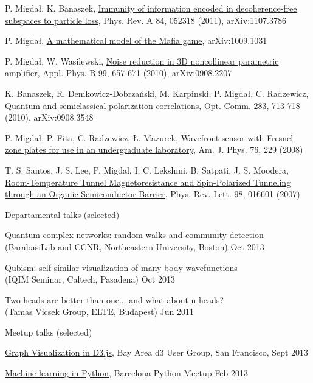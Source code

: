 \documentclass[margin,line]{resume}
\begin{document}
\begin{resume}
\begin{list2}
        \item P. Migdał, K. Banaszek, \href{http://arxiv.org/abs/1107.3786}{Immunity of information encoded in decoherence-free subspaces to particle loss}, Phys. Rev. A 84, 052318 (2011), arXiv:1107.3786
    	\item P. Migdał, \href{http://arxiv.org/abs/1009.1031}{A mathematical model of the Mafia game}, arXiv:1009.1031
        \item P. Migdał, W. Wasilewski, \href{http://dx.doi.org/10.1007/s00340-010-3915-z}{Noise reduction in 3D noncollinear parametric amplifier}, Appl. Phys. B 99, 657-671 (2010), arXiv:0908.2207
        \item K. Banaszek, R. Demkowicz-Dobrzański, M. Karpinski, P. Migdał, C. Radzewicz, \href{http://arxiv.org/abs/0908.3548}{Quantum and semiclassical polarization correlations}, Opt. Comm. 283, 713-718 (2010), arXiv:0908.3548
        \item P. Migdał, P. Fita, C. Radzewicz, Ł. Mazurek, \href{http://ultrafast.fuw.edu.pl/publications/ajp_2008.pdf}{Wavefront sensor with Fresnel zone plates for use in an undergraduate laboratory}, Am. J. Phys. 76, 229 (2008)
        \item T. S. Santos, J. S. Lee, P. Migdal, I. C. Lekshmi, B. Satpati, J. S. Moodera, \href{http://dx.doi.org/10.1103/PhysRevLett.98.016601}{Room-Temperature Tunnel Magnetoresistance and Spin-Polarized Tunneling through an Organic Semiconductor Barrier}, Phys. Rev. Lett. 98, 016601 (2007)
    \end{list2}

\newpage


    Departamental talks (selected)
    \begin{list2}
        \item Quantum complex networks: random walks and community-detection\\
        (BarabasiLab and CCNR, Northeastern University, Boston) \hfill Oct 2013
        \item Qubism: self-similar visualization of many-body wavefunctions\\
        (IQIM Seminar, Caltech, Pasadena) \hfill Oct 2013
        \item Two heads are better than one... and what about n heads?\\
        (Tamas Vicsek Group, ELTE, Budapest) \hfill Jun 2011
    \end{list2}

    Meetup talks (selected)
    \begin{list2}
        \item \href{http://www.meetup.com/Bay-Area-d3-User-Group/events/133292932/}{Graph Visualization in D3.js}, Bay Area d3 User Group, San Francisco, \hfill Sept 2013
        \item \href{http://nbviewer.ipython.org/gist/stared/4738143}{Machine learning in Python}, Barcelona Python Meetup \hfill Feb 2013
    \end{list2}


\end{resume}
\end{document}
